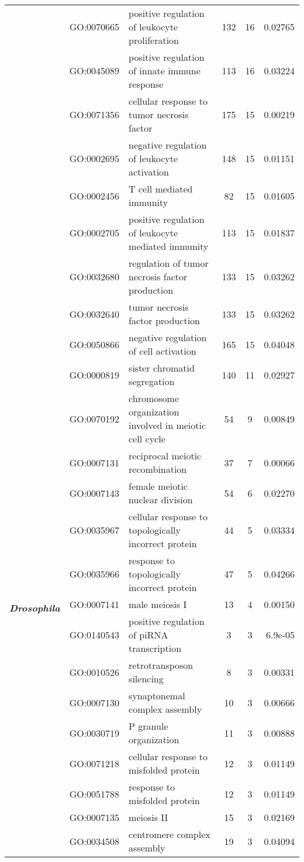 \documentclass[../main.tex]{subfiles}
\begin{document}
\begin{landscape}
\begin{longtable}{@{}lllccr@{}}
     & GO:0070665 & positive regulation of leukocyte proliferation & 132 & 16 & 0.02765 \\
     & GO:0045089 & positive regulation of innate immune response & 113 & 16 & 0.03224 \\
     & GO:0071356 & cellular response to tumor necrosis factor & 175 & 15 & 0.00219 \\
     & GO:0002695 & negative regulation of leukocyte activation & 148 & 15 & 0.01151 \\
     & GO:0002456 & T cell mediated immunity & 82 & 15 & 0.01605 \\
     & GO:0002705 & positive regulation of leukocyte mediated immunity & 113 & 15 & 0.01837 \\
     & GO:0032680 & regulation of tumor necrosis factor production & 133 & 15 & 0.03262 \\
     & GO:0032640 & tumor necrosis factor production & 133 & 15 & 0.03262 \\
     & GO:0050866 & negative regulation of cell activation & 165 & 15 & 0.04048 \\* \midrule
    \multirow{15}{*}{\textit{\textbf{Drosophila}}} & GO:0000819 & sister chromatid segregation & 140 & 11 & 0.02927 \\
     & GO:0070192 & chromosome organization involved in meiotic cell cycle & 54 & 9 & 0.00849 \\
     & GO:0007131 & reciprocal meiotic recombination & 37 & 7 & 0.00066 \\
     & GO:0007143 & female meiotic nuclear division & 54 & 6 & 0.02270 \\
     & GO:0035967 & cellular response to topologically incorrect protein & 44 & 5 & 0.03334 \\
     & GO:0035966 & response to topologically incorrect protein & 47 & 5 & 0.04266 \\
     & GO:0007141 & male meiosis I & 13 & 4 & 0.00150 \\
     & GO:0140543 & positive regulation of piRNA transcription & 3 & 3 & 6.9e-05 \\
     & GO:0010526 & retrotransposon silencing & 8 & 3 & 0.00331 \\
     & GO:0007130 & synaptonemal complex assembly & 10 & 3 & 0.00666 \\
     & GO:0030719 & P granule organization & 11 & 3 & 0.00888 \\
     & GO:0071218 & cellular response to misfolded protein & 12 & 3 & 0.01149 \\
     & GO:0051788 & response to misfolded protein & 12 & 3 & 0.01149 \\
     & GO:0007135 & meiosis II & 15 & 3 & 0.02169 \\
     & GO:0034508 & centromere complex assembly & 19 & 3 & 0.04094 \\* \bottomrule \bottomrule
    \end{longtable}
    \end{landscape}
\end{document}
